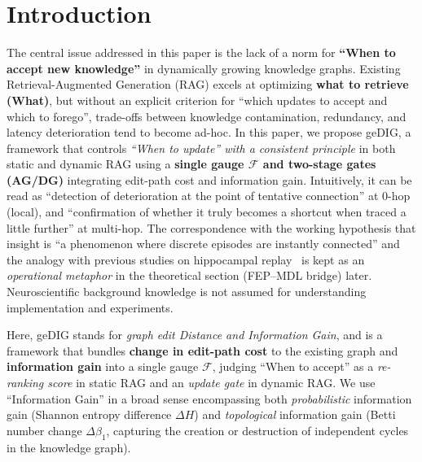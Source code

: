 \documentclass[12pt]{article}
\newcommand{\F}{\mathcal{F}}
\begin{document}
\section{Introduction}
The central issue addressed in this paper is the lack of a norm for \textbf{``When to accept new knowledge''} in dynamically growing knowledge graphs.
Existing Retrieval-Augmented Generation (RAG) excels at optimizing \textbf{what to retrieve (What)}, but without an explicit criterion for ``which updates to accept and which to forego'', trade-offs between knowledge contamination, redundancy, and latency deterioration tend to become ad-hoc.
In this paper, we propose geDIG, a framework that controls \emph{``When to update'' with a consistent principle} in both static and dynamic RAG using a \textbf{single gauge $\F$ and two-stage gates (AG/DG)} integrating edit-path cost and information gain.
Intuitively, it can be read as ``detection of deterioration at the point of tentative connection'' at 0-hop (local), and ``confirmation of whether it truly becomes a shortcut when traced a little further'' at multi-hop.
The correspondence with the working hypothesis that insight is ``a phenomenon where discrete episodes are instantly connected'' and the analogy with previous studies on hippocampal replay~\cite{Buzsaki2015,Carr2011,Pfeiffer2013} is kept as an \emph{operational metaphor} in the theoretical section (FEP--MDL bridge) later.
Neuroscientific background knowledge is not assumed for understanding implementation and experiments.

Here, geDIG stands for \textit{graph edit Distance and Information Gain}, and is a framework that bundles \textbf{change in edit-path cost} to the existing graph and \textbf{information gain} into a single gauge $\F$, judging ``When to accept'' as a \emph{re-ranking score} in static RAG and an \emph{update gate} in dynamic RAG.
We use ``Information Gain'' in a broad sense encompassing both \emph{probabilistic} information gain (Shannon entropy difference $\Delta H$) and \emph{topological} information gain (Betti number change $\Delta\beta_1$, capturing the creation or destruction of independent cycles in the knowledge graph).

\end{document}
